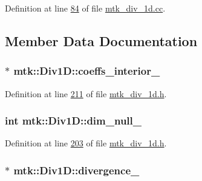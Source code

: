 Definition at line \hyperlink{mtk__div__1d_8cc_source_l00084}{84} of file \hyperlink{mtk__div__1d_8cc_source}{mtk\+\_\+div\+\_\+1d.\+cc}.



\subsection{Member Data Documentation}
\hypertarget{classmtk_1_1Div1D_a7c7688d8ac25120587353ece4e93a13a}{
\subsubsection[{coeffs\+\_\+interior\+\_\+}]{$\ast$ mtk\+::\+Div1\+D\+::coeffs\+\_\+interior\+\_\+\hspace{0.3cm}{\ttfamily [private]}}}\label{classmtk_1_1Div1D_a7c7688d8ac25120587353ece4e93a13a}


Definition at line \hyperlink{mtk__div__1d_8h_source_l00211}{211} of file \hyperlink{mtk__div__1d_8h_source}{mtk\+\_\+div\+\_\+1d.\+h}.

\hypertarget{classmtk_1_1Div1D_a264027144def76d802778391f55381a0}{
\subsubsection[{dim\+\_\+null\+\_\+}]{\setlength{\rightskip}{0pt plus 5cm}int mtk\+::\+Div1\+D\+::dim\+\_\+null\+\_\+\hspace{0.3cm}{\ttfamily [private]}}}\label{classmtk_1_1Div1D_a264027144def76d802778391f55381a0}


Definition at line \hyperlink{mtk__div__1d_8h_source_l00203}{203} of file \hyperlink{mtk__div__1d_8h_source}{mtk\+\_\+div\+\_\+1d.\+h}.

\hypertarget{classmtk_1_1Div1D_a0f96410051ba1fa6d91dfa7b7eacead9}{
\subsubsection[{divergence\+\_\+}]{$\ast$ mtk\+::\+Div1\+D\+::divergence\+\_\+\hspace{0.3cm}{\ttfamily [private]}}}\label{classmtk_1_1Div1D_a0f96410051ba1fa6d91dfa7b7eacead9}


